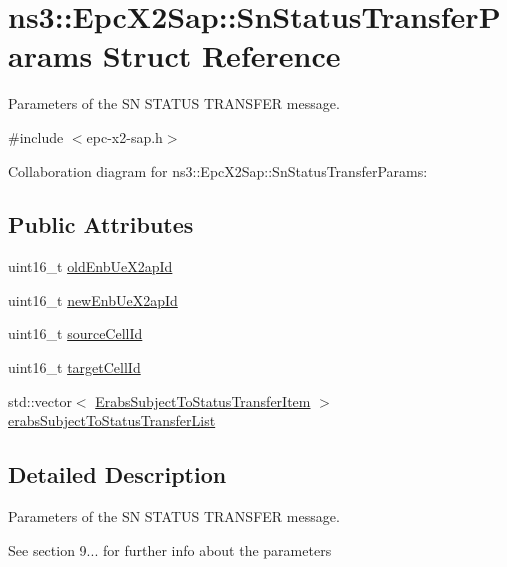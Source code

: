 \hypertarget{structns3_1_1EpcX2Sap_1_1SnStatusTransferParams}{}\section{ns3\+:\+:Epc\+X2\+Sap\+:\+:Sn\+Status\+Transfer\+Params Struct Reference}
\label{structns3_1_1EpcX2Sap_1_1SnStatusTransferParams}


Parameters of the SN S\+T\+A\+T\+US T\+R\+A\+N\+S\+F\+ER message.  




{\ttfamily \#include $<$epc-\/x2-\/sap.\+h$>$}



Collaboration diagram for ns3\+:\+:Epc\+X2\+Sap\+:\+:Sn\+Status\+Transfer\+Params\+:
\subsection*{Public Attributes}
\begin{DoxyCompactItemize}
\item 
uint16\+\_\+t \hyperlink{structns3_1_1EpcX2Sap_1_1SnStatusTransferParams_a6ae88dfb305b7153560d57aaf36dfbf1}{old\+Enb\+Ue\+X2ap\+Id}
\item 
uint16\+\_\+t \hyperlink{structns3_1_1EpcX2Sap_1_1SnStatusTransferParams_a00a4e82e6073e15875c4b59841ad655c}{new\+Enb\+Ue\+X2ap\+Id}
\item 
uint16\+\_\+t \hyperlink{structns3_1_1EpcX2Sap_1_1SnStatusTransferParams_acbd1a1576a0e5487cc20d3f9861821ef}{source\+Cell\+Id}
\item 
uint16\+\_\+t \hyperlink{structns3_1_1EpcX2Sap_1_1SnStatusTransferParams_a89e385b30db3082f394b5a3470d5c230}{target\+Cell\+Id}
\item 
std\+::vector$<$ \hyperlink{structns3_1_1EpcX2Sap_1_1ErabsSubjectToStatusTransferItem}{Erabs\+Subject\+To\+Status\+Transfer\+Item} $>$ \hyperlink{structns3_1_1EpcX2Sap_1_1SnStatusTransferParams_a1f422b0f1816c6c239a51aa3f9d3d674}{erabs\+Subject\+To\+Status\+Transfer\+List}
\end{DoxyCompactItemize}


\subsection{Detailed Description}
Parameters of the SN S\+T\+A\+T\+US T\+R\+A\+N\+S\+F\+ER message. 

See section 9... for further info about the parameters 

